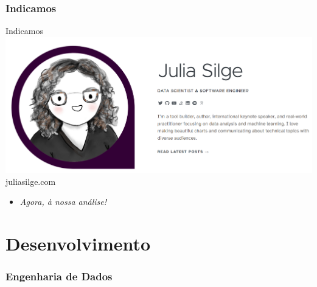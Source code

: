\documentclass[
  9 pt,
  ignorenonframetext,
]{beamer}
\providecommand{\tightlist}{%
  \setlength{\itemsep}{0pt}\setlength{\parskip}{0pt}}
\begin{document}
\hypertarget{indicamos}{%
\subsubsection{Indicamos}\label{indicamos}}

\begin{frame}{Indicamos}
\includegraphics{./Imagens/juliasilge_mini.png} juliasilge.com

\begin{itemize}
\tightlist
\item
  \emph{Agora, à nossa análise!}
\end{itemize}
\end{frame}

\hypertarget{desenvolvimento}{%
\section{Desenvolvimento}\label{desenvolvimento}}

\hypertarget{engenharia-de-dados}{%
\subsubsection{Engenharia de Dados}\label{engenharia-de-dados}}
\end{document}
